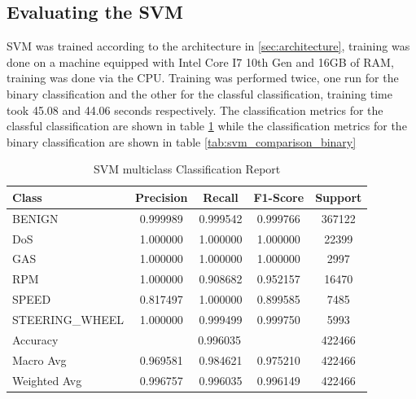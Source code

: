 \documentclass[conference]{IEEEtran}
\begin{document}
\subsection{Evaluating the SVM}
SVM was trained according to the architecture in \ref{sec:architecture}, training was done on a machine equipped with Intel Core I7 10th Gen and 16GB of RAM, training was done via the CPU.
Training was performed twice, one run for the binary classification and the other for the classful classification, training time took 45.08 and 44.06 seconds respectively.
The classification metrics for the classful classification are shown in table \ref{tab:classification_report_svm} while the classification metrics for the binary classification are shown in table \ref{tab:svm_comparison_binary}

\begin{table}[h]
\centering
\caption{SVM multiclass Classification Report}
\begin{tabular}{lcccc}
\hline
\textbf{Class} & \textbf{Precision} & \textbf{Recall} & \textbf{F1-Score} & \textbf{Support} \\
\hline
BENIGN          & 0.999989 & 0.999542 & 0.999766 & 367122 \\
DoS             & 1.000000 & 1.000000 & 1.000000 & 22399 \\
GAS             & 1.000000 & 1.000000 & 1.000000 & 2997 \\
RPM             & 1.000000 & 0.908682 & 0.952157 & 16470 \\
SPEED           & 0.817497 & 1.000000 & 0.899585 & 7485 \\
STEERING\_WHEEL & 1.000000 & 0.999499 & 0.999750 & 5993 \\
\hline
Accuracy     & \multicolumn{3}{c}{0.996035} & 422466 \\
Macro Avg    & 0.969581 & 0.984621 & 0.975210 & 422466 \\
Weighted Avg & 0.996757 & 0.996035 & 0.996149 & 422466 \\
\hline
\end{tabular}
\label{tab:classification_report_svm}
\end{table}
\end{document}
